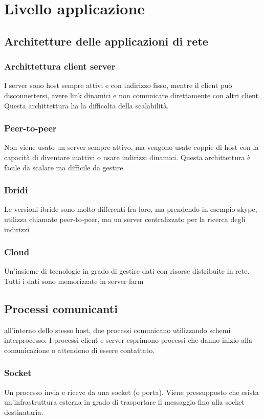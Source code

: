 \documentclass[12pt, a4paper]{article}
\begin{document}
\newpage
\section{Livello applicazione}
\subsection{Architetture delle applicazioni di rete}
\subsubsection*{Archittettura client server}
I server sono host sempre attivi e con indirizzo fisso, mentre il client può disconnettersi, avere link dinamici e 
non comunicare direttamente con altri client.\\Questa archittettura ha la difficolta della scalabilità.

\subsubsection*{Peer-to-peer}
Non viene usato un server sempre attivo, ma vengono usate coppie di host con la capacità di diventare inattivi o usare indirizzi
dinamici. Questa archittettura è facile da scalare ma difficile da gestire

\subsubsection*{Ibridi}
Le versioni ibride sono molto differenti fra loro, ma prendendo in esempio skype, utilizza chiamate peer-to-peer, ma un 
server centralizzato per la ricerca degli indirizzi

\subsubsection*{Cloud}
Un'insieme di tecnologie in grado di gestire dati con risorse distribuite in rete. Tutti i dati sono memorizzate in server
farm

\subsection{Processi comunicanti}
all'interno dello stesso host, due processi comunicano utilizzando schemi interprocesso. I processi client e server esprimono
processi che danno inizio alla comunicazione o attendono di essere contattato.

\subsubsection*{Socket}
Un processo invia e riceve da una socket (o porta). Viene pressupposto che esista un'infrastruttura esterna in grado di 
trasportare il messaggio fino alla socket destinataria.
\end{document}
